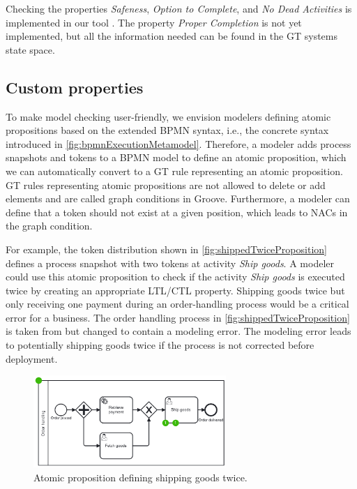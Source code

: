 \documentclass{lmcs} %
\begin{document}
Checking the properties \textit{Safeness}, \textit{Option to Complete}, and \textit{No Dead Activities} is implemented in our tool \cite{timkrauterLMCS2024Artifacts2023}.
The property \textit{Proper Completion} is not yet implemented, but all the information needed can be found in the GT systems state space.

\subsection{Custom properties} \label{subsec:customProperties}
To make model checking user-friendly, we envision modelers defining atomic propositions based on the extended BPMN syntax, i.e., the concrete syntax introduced in \autoref{fig:bpmnExecutionMetamodel}.
Therefore, a modeler adds process snapshots and tokens to a BPMN model to define an atomic proposition, which we can automatically convert to a GT rule representing an atomic proposition.
GT rules representing atomic propositions are not allowed to delete or add elements and are called graph conditions in Groove.
Furthermore, a modeler can define that a token should not exist at a given position, which leads to NACs in the graph condition. 

For example, the token distribution shown in \autoref{fig:shippedTwiceProposition} defines a process snapshot with two tokens at activity \textit{Ship goods}.
A modeler could use this atomic proposition to check if the activity \textit{Ship goods} is executed twice by creating an appropriate LTL/CTL property.
Shipping goods twice but only receiving one payment during an order-handling process would be a critical error for a business.
The order handling process in \autoref{fig:shippedTwiceProposition} is taken from \cite{ruckerPracticalProcessAutomation2021} but changed to contain a modeling error.
The modeling error leads to potentially shipping goods twice if the process is not corrected before deployment.

\begin{figure}[ht]
    \centering
    \includegraphics[width=0.65\textwidth]{images/shippedTwiceProposition.pdf}
    \caption{Atomic proposition defining shipping goods twice.}
    \label{fig:shippedTwiceProposition}
\end{figure}
\end{document}
